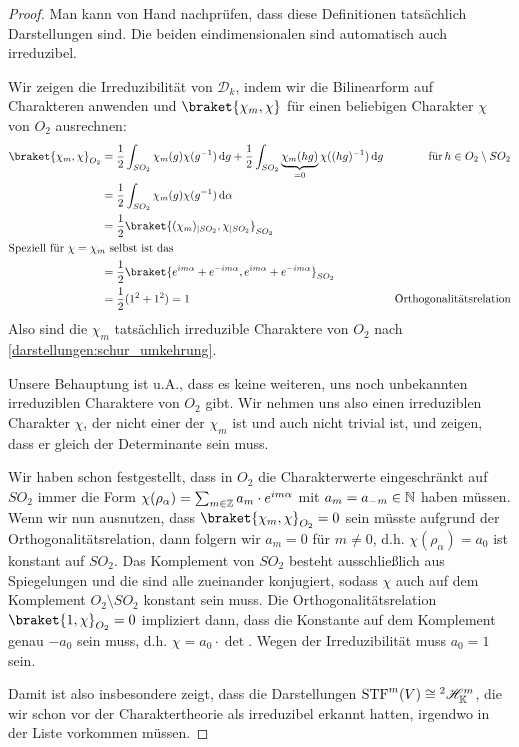 \begin{proof}
Man kann von Hand nachprüfen, dass diese Definitionen tatsächlich Darstellungen sind. Die beiden eindimensionalen sind automatisch auch irreduzibel.

Wir zeigen die Irreduzibilität von $\mathcal{D}_k$, indem wir die Bilinearform auf Charakteren anwenden und $\braket{\chi_m,\chi}$ für einen beliebigen Charakter $\chi$ von $O_2$ ausrechnen:
\begin{align*}
\braket{\chi_m,\chi}_{O_2} &= \frac{1}{2}\int_{SO_2} \chi_m(g)\chi(g^{-1}) \dd g + \frac{1}{2}\int_{SO_2} \underbrace{\chi_m(hg)}_{=0}\chi((hg)^{-1})\dd g &\text{für}\,h\in O_2\setminus SO_2\\
&= \frac{1}{2}\int_{SO_2} \chi_m(g)\chi(g^{-1}) \dd \alpha \\
&= \frac{1}{2} \braket{ (\chi_m)_{|SO_2} , \chi_{|SO_2}}_{SO_2} \\
\intertext{Speziell für $\chi=\chi_m$ selbst ist das}
&= \frac{1}{2} \braket{e^{im\alpha} + e^{-im\alpha}, e^{im\alpha} + e^{-im\alpha}}_{SO_2} \\
&=\frac{1}{2}(1^2 + 1^2)=1 &\text{Orthogonalitätsrelation}
\end{align*}
Also sind die $\chi_m$ tatsächlich irreduzible Charaktere von $O_2$ nach \ref{darstellungen:schur_umkehrung}.

\medbreak
Unsere Behauptung ist u.A., dass es keine weiteren, uns noch unbekannten irreduziblen Charaktere von $O_2$ gibt. Wir nehmen uns also einen irreduziblen Charakter $\chi$, der nicht einer der $\chi_m$ ist und auch nicht trivial ist, und zeigen, dass er gleich der Determinante sein muss.

\smallbreak
Wir haben schon festgestellt, dass in $O_2$ die Charakterwerte eingeschränkt auf $SO_2$ immer die Form $\chi(\rho_\alpha) = \sum_{m\in\mathbb{Z}} a_m\cdot  e^{im\alpha}$ mit $a_m=a_{-m}\in\mathbb{N}$ haben müssen. Wenn wir nun ausnutzen, dass $\braket{\chi_m,\chi}_{O_2}=0$ sein müsste aufgrund der Orthogonalitätsrelation, dann folgern wir $a_m=0$ für $m\neq 0$, d.h. $\chi(\rho_\alpha)=a_0$ ist konstant auf $SO_2$. Das Komplement von $SO_2$ besteht ausschließlich aus Spiegelungen und die sind alle zueinander konjugiert, sodass $\chi$ auch auf dem Komplement $O_2\setminus SO_2$ konstant sein muss. Die Orthogonalitätsrelation $\braket{1,\chi}_{O_2}=0$ impliziert dann, dass die Konstante auf dem Komplement genau $-a_0$ sein muss, d.h. $\chi = a_0\cdot \det$. Wegen der Irreduzibilität muss $a_0=1$ sein.

\medbreak
Damit ist also insbesondere zeigt, dass die Darstellungen $\operatorname{STF}^m(V)\cong {^2}\mathscr{H}_{\mathbb{K}}^m$, die wir schon vor der Charaktertheorie als irreduzibel erkannt hatten, irgendwo in der Liste vorkommen müssen.


\end{proof}
